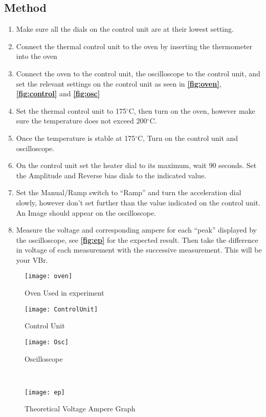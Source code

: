 \documentclass[12pt]{article}
\begin{document}
\subsection{Method}
\begin{enumerate}
    \item Make sure all the dials on the control unit are at their lowest setting.

    \item Connect the thermal control unit to the oven by inserting the thermometer into the oven

    \item Connect the oven to the control unit, the oscilloscope to the control unit, and set the
        relevant settings on the control unit as seen in
        \textbf{\autoref{fig:oven}}, \textbf{\autoref{fig:control}} and \textbf{\autoref{fig:osc}}

    \item Set the thermal control unit to 175$^{\circ}$C, then turn on the oven,
        however make sure the temperature does not exceed 200$^{\circ}$C.

    \item Once the temperature is stable at 175$^{\circ}$C, Turn on the control unit and oscilloscope.

    \item On the control unit set the heater dial to its maximum, wait 90 seconds.
        Set the Amplitude and Reverse bias dials to the indicated value.

    \item Set the Manual/Ramp switch to ``Ramp'' and turn the acceleration dial slowly, however don't
        set further than the value indicated on the control unit. An Image should appear on the oscilloscope.

    \item Measure the voltage and corresponding ampere for each ``peak'' displayed by the oscilloscope,
        see \textbf{\autoref{fig:ep}} for the expected result. 
        Then take the difference in voltage of each measurement with the successive measurement.
        This will be your VBr.
\end{enumerate}



\begin{figure}[H]

	\texttt{[image: oven]}
	\centering
	\caption{Oven Used in experiment}
	\label{fig:oven}
	\texttt{[image: ControlUnit]}
	\centering
	\caption{Control Unit}
	\label{fig:control}
	\texttt{[image: Osc]}
	\centering
	\caption{Oscilloscope}
	\label{fig:osc}
\end{figure}
\\
\begin{figure}
    \texttt{[image: ep]}
    \centering
    \caption{Theoretical Voltage Ampere Graph}
    \label{fig:ep}
\end{figure}
\end{document}
